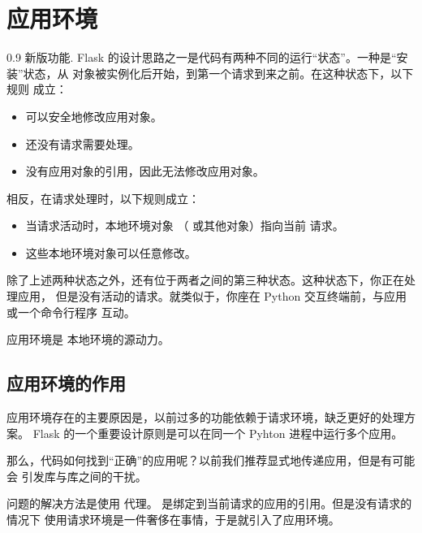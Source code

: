\documentclass[a4paper,12pt]{sphinxmanual}
\begin{document}
\chapter{应用环境}
\label{appcontext:app-context}\label{appcontext::doc}\label{appcontext:id1}0.9 新版功能.
Flask 的设计思路之一是代码有两种不同的运行“状态”。一种是“安装”状态，从
 对象被实例化后开始，到第一个请求到来之前。在这种状态下，以下规则
成立：
\begin{itemize}
\item {} 
可以安全地修改应用对象。

\item {} 
还没有请求需要处理。

\item {} 
没有应用对象的引用，因此无法修改应用对象。

\end{itemize}

相反，在请求处理时，以下规则成立：
\begin{itemize}
\item {} 
当请求活动时，本地环境对象 （ {\hyperref[api:flask.request]{}} 或其他对象）指向当前
请求。

\item {} 
这些本地环境对象可以任意修改。

\end{itemize}

除了上述两种状态之外，还有位于两者之间的第三种状态。这种状态下，你正在处理应用，
但是没有活动的请求。就类似于，你座在 Python 交互终端前，与应用或一个命令行程序
互动。

应用环境是 {\hyperref[api:flask.current_app]{}} 本地环境的源动力。


\section{应用环境的作用}
\label{appcontext:id2}
应用环境存在的主要原因是，以前过多的功能依赖于请求环境，缺乏更好的处理方案。
Flask 的一个重要设计原则是可以在同一个 Pyhton 进程中运行多个应用。

那么，代码如何找到“正确”的应用呢？以前我们推荐显式地传递应用，但是有可能会
引发库与库之间的干扰。

问题的解决方法是使用 {\hyperref[api:flask.current_app]{}} 代理。
{\hyperref[api:flask.current_app]{}} 是绑定到当前请求的应用的引用。但是没有请求的情况下
使用请求环境是一件奢侈在事情，于是就引入了应用环境。
\end{document}
